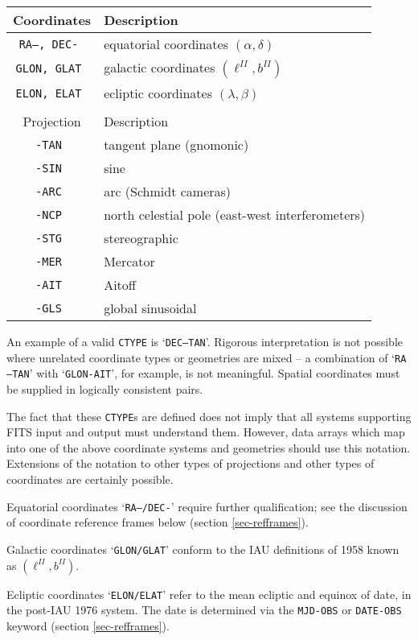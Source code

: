 \begin{center}
\begin{tabular}{cl}
Coordinates & Description \\
\hline
\tt RA--, DEC- & equatorial coordinates $(\alpha,\delta)$ \\
\tt GLON, GLAT & galactic coordinates $(\ell^{II},b^{II})$ \\
\tt ELON, ELAT & ecliptic coordinates $(\lambda,\beta)$ \\
 & \\
Projection & Description \\
\hline
\tt -TAN & tangent plane (gnomonic) \\
\tt -SIN & sine \\
\tt -ARC & arc (Schmidt cameras) \\
\tt -NCP & north celestial pole (east-west interferometers) \\
\tt -STG & stereographic \\
\tt -MER & Mercator \\
\tt -AIT & Aitoff \\
\tt -GLS & global sinusoidal \\
\end{tabular}
\end{center}

An example of a valid {\tt CTYPE} is `{\tt DEC--TAN}'. Rigorous interpretation
is not possible where unrelated coordinate types or geometries are mixed -- a
combination of `{\tt RA---TAN}' with `{\tt GLON-AIT}', for example, is not
meaningful.  Spatial coordinates must be supplied in logically consistent
pairs.

The fact that these {\tt CTYPE}s are defined does not imply that all systems
supporting FITS input and output must understand them.  However, data arrays
which map into one of the above coordinate systems and geometries should use
this notation.  Extensions of the notation to other types of projections and
other types of coordinates are certainly possible.

Equatorial coordinates `{\tt RA--/DEC-}' require further qualification; see the
discussion of coordinate reference frames below (section \ref{sec-refframes}). 

Galactic coordinates `{\tt GLON/GLAT}' conform to the IAU definitions of
1958 known as $(\ell^{II}, b^{II})$.

Ecliptic coordinates `{\tt ELON/ELAT}' refer to the mean ecliptic and equinox
of date, in the post-IAU 1976 system.  The date is determined via the 
{\tt MJD-OBS} or {\tt DATE-OBS} keyword (section \ref{sec-refframes}). 


